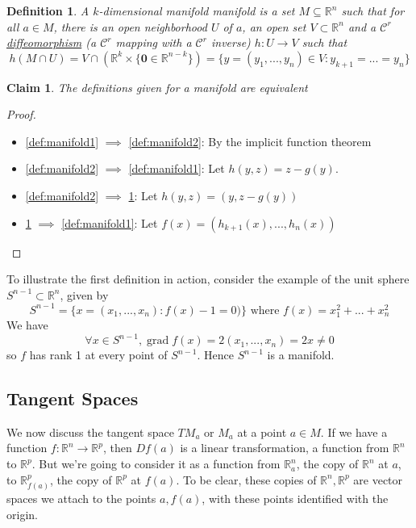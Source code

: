 \documentclass{article}
\newtheorem{definition}{Definition}
\newtheorem{claim}{Claim}
\DeclareMathOperator{\grad}{grad}
\newcommand{\reals}[0]{\mathbb{R}}
\newcommand{\mc}[1]{\mathcal{#1}}
\newcommand{\mb}[1]{\mathbf{#1}}
\begin{document}
\begin{definition}
  A \(k\)-dimensional manifold manifold is a set \(M \subseteq \reals^n\) such that for all \(a \in M\), there is an open neighborhood \(U\) of \(a\), an open set \(V \subset \reals^n\) and a \(\mc{C}^r\) \underline{diffeomorphism} (a \(\mc{C}^r\) mapping with a \(\mc{C}^r\) inverse) \(h: U \to V\) such that
  \[h(M \cap U) = V \cap (\reals^k \times \{\mb{0} \in \reals^{n - k}\}) =
  \{y = (y_1,...,y_n) \in V : y_{k + 1} = ... = y_n\}\]
  \label{def:manifold3}
\end{definition}
\begin{claim}
  The definitions given for a manifold are equivalent
\end{claim}
\begin{proof}
\begin{itemize}

  \item \ref{def:manifold1} \(\implies\) \ref{def:manifold2}: By the implicit function theorem

  \item \ref{def:manifold2} \(\implies\) \ref{def:manifold1}: Let \(h(y, z) = z - g(y)\).

  \item \ref{def:manifold2} \(\implies\) \ref{def:manifold3}: Let \(h(y, z) = (y, z - g(y))\)

  \item \ref{def:manifold3} \(\implies\) \ref{def:manifold1}: Let \(f(x) = (h_{k + 1}(x),...,h_n(x))\)

\end{itemize}
\end{proof}

To illustrate the first definition in action, consider the example of the unit sphere \(S^{n - 1} \subset \reals^n\), given by
\[S^{n - 1} = \{x = (x_1,...,x_n) : f(x) - 1 = 0)\} \text{ where } f(x) = x_1^2 + ... + x_n^2\]
We have
\[\forall x \in S^{n - 1}, \grad f(x) = 2(x_1,...,x_n) = 2x \neq 0\]
so \(f\) has rank 1 at every point of \(S^{n - 1}\). Hence \(S^{n - 1}\) is a manifold.

\subsection{Tangent Spaces}

We now discuss the tangent space \(TM_a\) or \(M_a\) at a point \(a \in M\). If we have a function \(f: \reals^n \to \reals^p\), then \(Df(a)\) is a linear transformation, a function from \(\reals^n\) to \(\reals^p\). But we're going to consider it as a function from \(\reals^n_a\), the copy of \(\reals^n\) at \(a\), to \(\reals^p_{f(a)}\), the copy of \(\reals^p\) at \(f(a)\). To be clear, these copies of \(\reals^n, \reals^p\) are vector spaces we attach to the points \(a, f(a)\), with these points identified with the origin.
\end{document}
